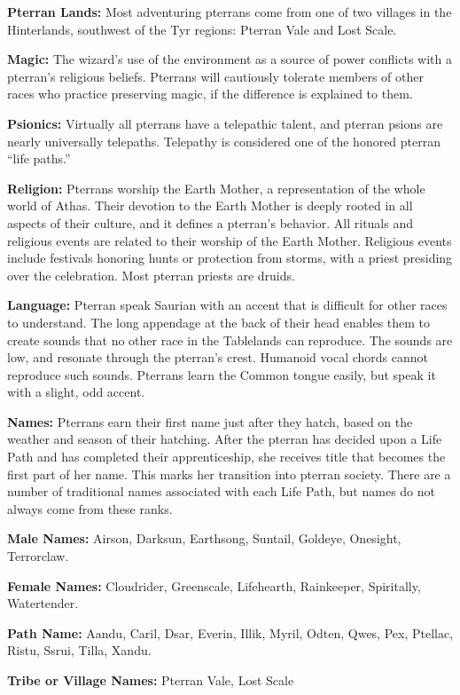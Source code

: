 \textbf{Pterran Lands:} Most adventuring pterrans come from one of two villages in the Hinterlands, southwest of the Tyr regions: Pterran Vale and Lost Scale.

\textbf{Magic:} The wizard's use of the environment as a source of power conflicts with a pterran's religious beliefs. Pterrans will cautiously tolerate members of other races who practice preserving magic, if the difference is explained to them.

\textbf{Psionics:} Virtually all pterrans have a telepathic talent, and pterran psions are nearly universally telepaths. Telepathy is considered one of the honored pterran ``life paths.''

\textbf{Religion:} Pterrans worship the Earth Mother, a representation of the whole world of Athas. Their devotion to the Earth Mother is deeply rooted in all aspects of their culture, and it defines a pterran's behavior. All rituals and religious events are related to their worship of the Earth Mother. Religious events include festivals honoring hunts or protection from storms, with a priest presiding over the celebration. Most pterran priests are druids.

\textbf{Language:} Pterran speak Saurian with an accent that is difficult for other races to understand. The long appendage at the back of their head enables them to create sounds that no other race in the Tablelands can reproduce. The sounds are low, and resonate through the pterran's crest. Humanoid vocal chords cannot reproduce such sounds. Pterrans learn the Common tongue easily, but speak it with a slight, odd accent.

\textbf{Names:} Pterrans earn their first name just after they hatch, based on the weather and season of their hatching. After the pterran has decided upon a Life Path and has completed their apprenticeship, she receives title that becomes the first part of her name. This marks her transition into pterran society. There are a number of traditional names associated with each Life Path, but names do not always come from these ranks.

\textbf{Male Names:} Airson, Darksun, Earthsong, Suntail, Goldeye, Onesight, Terrorclaw.

\textbf{Female Names:} Cloudrider, Greenscale, Lifehearth, Rainkeeper, Spiritally, Watertender.

\textbf{Path Name:} Aandu, Caril, Dsar, Everin, Illik, Myril, Odten, Qwes, Pex, Ptellac, Ristu, Ssrui, Tilla, Xandu.

\textbf{Tribe or Village Names:} Pterran Vale, Lost Scale


